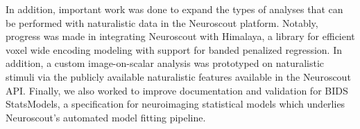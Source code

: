 \documentclass[../main.tex]{subfiles}
\begin{document}
In addition, important work was done to expand the types of analyses that can be performed with naturalistic data in the Neuroscout platform. Notably, progress was made in integrating Neuroscout with Himalaya, a library for efficient voxel wide encoding modeling with support for banded penalized regression. In addition, a custom image-on-scalar analysis was prototyped on naturalistic stimuli via the publicly available naturalistic features available in the Neuroscout API. Finally, we also worked to improve documentation and validation for BIDS StatsModels, a specification for neuroimaging statistical models which underlies Neuroscout’s automated model fitting pipeline. 
\end{document}
